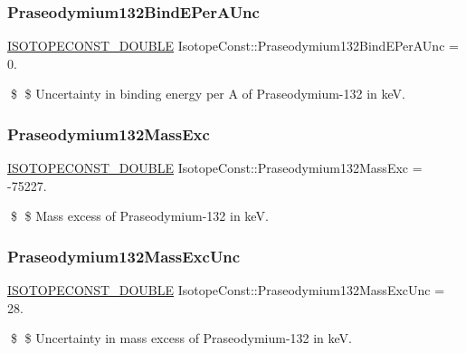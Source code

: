 \subsubsection{\texorpdfstring{Praseodymium132\+Bind\+E\+Per\+A\+Unc}{Praseodymium132BindEPerAUnc}}
{\footnotesize\ttfamily \mbox{\hyperlink{group___isotope_const-_macros_ga8f45a7272ce02c0b4c65c44636ed719a}{I\+S\+O\+T\+O\+P\+E\+C\+O\+N\+S\+T\+\_\+\+D\+O\+U\+B\+LE}} Isotope\+Const\+::\+Praseodymium132\+Bind\+E\+Per\+A\+Unc = 0.}

\$ \$ Uncertainty in binding energy per A of Praseodymium-\/132 in keV. \mbox{\label{group___isotope_const-_praseodymium-_pr132_gad09ed6695ef26ba9746aaaa3d2ab09c4}} 
\subsubsection{\texorpdfstring{Praseodymium132\+Mass\+Exc}{Praseodymium132MassExc}}
{\footnotesize\ttfamily \mbox{\hyperlink{group___isotope_const-_macros_ga8f45a7272ce02c0b4c65c44636ed719a}{I\+S\+O\+T\+O\+P\+E\+C\+O\+N\+S\+T\+\_\+\+D\+O\+U\+B\+LE}} Isotope\+Const\+::\+Praseodymium132\+Mass\+Exc = -\/75227.}

\$ \$ Mass excess of Praseodymium-\/132 in keV. \mbox{\label{group___isotope_const-_praseodymium-_pr132_ga1a7a25d942519614cb7281a80106e254}} 
\subsubsection{\texorpdfstring{Praseodymium132\+Mass\+Exc\+Unc}{Praseodymium132MassExcUnc}}
{\footnotesize\ttfamily \mbox{\hyperlink{group___isotope_const-_macros_ga8f45a7272ce02c0b4c65c44636ed719a}{I\+S\+O\+T\+O\+P\+E\+C\+O\+N\+S\+T\+\_\+\+D\+O\+U\+B\+LE}} Isotope\+Const\+::\+Praseodymium132\+Mass\+Exc\+Unc = 28.}

\$ \$ Uncertainty in mass excess of Praseodymium-\/132 in keV. \mbox{\label{group___isotope_const-_praseodymium-_pr132_ga9f960a946981383da2f470d60a4946a3}} 
